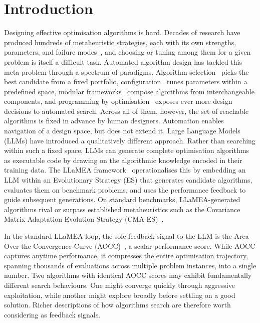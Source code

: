 
\chapter{Introduction}
\label{ch:introduction}

Designing effective optimisation algorithms is hard. Decades of research have produced hundreds of metaheuristic strategies, each with its own strengths, parameters, and failure modes~\cite{eiben2015introduction}, and choosing or tuning among them for a given problem is itself a difficult task. Automated algorithm design has tackled this meta-problem through a spectrum of paradigms. Algorithm selection~\cite{rice1976algorithmselection} picks the best candidate from a fixed portfolio, configuration~\cite{hutter2009paramils} tunes parameters within a predefined space, modular frameworks~\cite{vanRijn2016modular} compose algorithms from interchangeable components, and programming by optimisation~\cite{hoos2012pbo} exposes ever more design decisions to automated search. Across all of them, however, the set of reachable algorithms is fixed in advance by human designers. Automation enables navigation of a design space, but does not extend it. Large Language Models (LLMs) have introduced a qualitatively different approach. Rather than searching within such a fixed space, LLMs can generate complete optimisation algorithms as executable code by drawing on the algorithmic knowledge encoded in their training data. The LLaMEA framework~\cite{vanStein2024LLaMEA} operationalises this by embedding an LLM within an Evolutionary Strategy (ES) that generates candidate algorithms, evaluates them on benchmark problems, and uses the performance feedback to guide subsequent generations. On standard benchmarks, LLaMEA-generated algorithms rival or surpass established metaheuristics such as the Covariance Matrix Adaptation Evolution Strategy (CMA-ES)~\cite{hansen2001cmaes}.

In the standard LLaMEA loop, the sole feedback signal to the LLM is the Area Over the Convergence Curve (AOCC)~\cite{vanStein2024LLaMEA}, a scalar performance score. While AOCC captures anytime performance, it compresses the entire optimisation trajectory, spanning thousands of evaluations across multiple problem instances, into a single number. Two algorithms with identical AOCC scores may exhibit fundamentally different search behaviours. One might converge quickly through aggressive exploitation, while another might explore broadly before settling on a good solution. Richer descriptions of how algorithms search are therefore worth considering as feedback signals.

